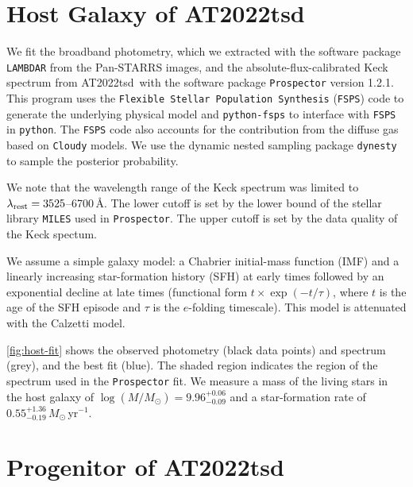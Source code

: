 \documentclass{nature_plusfigure}
\newcommand{\at}{AT2022tsd}
\begin{document}
\begin{methods}
\section{Host Galaxy of \at}
\label{sec:hostgalaxy}

We fit the broadband photometry, which we extracted with the software package \texttt{LAMBDAR}\cite{Wright2016} from the Pan-STARRS images\cite{Chambers2016}, and the absolute-flux-calibrated Keck spectrum from \at\ with the software package \texttt{Prospector} version 1.2.1\cite{Johnson2021}. This program uses the \texttt{Flexible Stellar Population Synthesis} (\texttt{FSPS}) code\cite{Conroy2009} to generate the underlying physical model and \texttt{python-fsps}\cite{ForemanMackey2014} to interface with \texttt{FSPS} in \texttt{python}. The \texttt{FSPS} code also accounts for the contribution from the diffuse gas based on \texttt{Cloudy} models\cite{Byler2017}. We use the dynamic nested sampling package \texttt{dynesty}\cite{Speagle2020} to sample the posterior probability.

We note that the wavelength range of the Keck spectrum was limited to $\lambda_{\rm rest}=3525$--6700\,\AA. The lower cutoff is set by the lower bound of the stellar library \texttt{MILES}\cite{SanchezBlazquez2006} used in \texttt{Prospector}. The upper cutoff is set by the data quality of the Keck spectum.%

We assume a simple galaxy model: a Chabrier initial-mass function (IMF)\cite{Chabrier2003} and a linearly increasing star-formation history (SFH) at early times followed by an exponential decline at late times (functional form $t \times \exp\left(-t/\tau\right)$, where $t$ is the age of the SFH episode and $\tau$ is the $e$-folding timescale). This model is attenuated with the Calzetti\cite{Calzetti2000} model. 

\ref{fig:host-fit} shows the observed photometry (black data points) and spectrum (grey), and the best fit (blue). The shaded region indicates the region of the spectrum used in the \texttt{Prospector} fit. We measure a mass of the living stars in the host galaxy of $\log(M/M_\odot)=9.96^{+0.06}_{-0.09}$ and a star-formation rate of $0.55^{+1.36}_{-0.19}\,M_\odot\,$yr$^{-1}$.

\section{Progenitor of \at}
\label{sec:at2022tsd-origin}


\end{methods}
\end{document}
